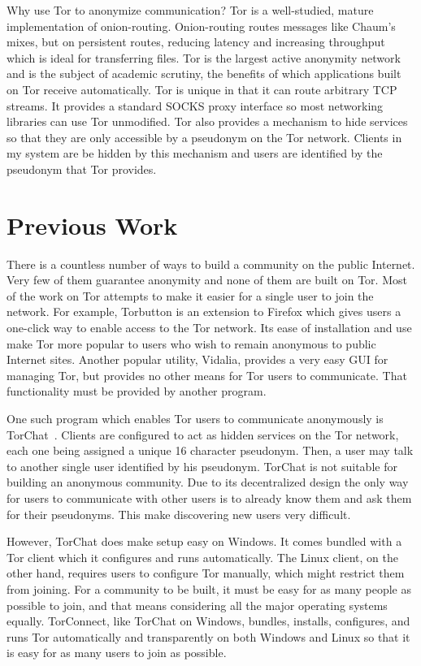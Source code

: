 \documentclass{article}
\begin{document}
Why use Tor to anonymize communication?  Tor is a well-studied, mature implementation of onion-routing.  Onion-routing routes messages like Chaum's mixes, but on persistent routes, reducing latency and increasing throughput which is ideal for transferring files.  Tor is the largest active anonymity network and is the subject of academic scrutiny, the benefits of which applications built on Tor receive automatically.  Tor is unique in that it can route arbitrary TCP streams.  It provides a standard SOCKS proxy interface so most networking libraries can use Tor unmodified.  Tor also provides a mechanism to hide services so that they are only accessible by a pseudonym on the Tor network.  Clients in my system are be hidden by this mechanism and users are identified by the pseudonym that Tor provides.


\section{Previous Work}
There is a countless number of ways to build a community on the public Internet.  Very few of them guarantee anonymity and none of them are built on Tor.  Most of the work on Tor attempts to make it easier for a single user to join the network.  For example, Torbutton is an extension to Firefox which gives users a one-click way to enable access to the Tor network.  Its ease of installation and use make Tor more popular to users who wish to remain anonymous to public Internet sites.  Another popular utility, Vidalia, provides a very easy GUI for managing Tor, but provides no other means for Tor users to communicate.  That functionality must be provided by another program.

One such program which enables Tor users to communicate anonymously is TorChat~\cite{tor-chat}.  Clients are configured to act as hidden services on the Tor network, each one being assigned a unique 16 character pseudonym.  Then, a user may talk to another single user identified by his pseudonym.  TorChat is not suitable for building an anonymous community.  Due to its decentralized design the only way for users to communicate with other users is to already know them and ask them for their pseudonyms.  This make discovering new users very difficult.

However, TorChat does make setup easy on Windows.  It comes bundled with a Tor client which it configures and runs automatically.  The Linux client, on the other hand, requires users to configure Tor manually, which might restrict them from joining.  For a community to be built, it must be easy for as many people as possible to join, and that means considering all the major operating systems equally.  TorConnect, like TorChat on Windows, bundles, installs, configures, and runs Tor automatically and transparently on both Windows and Linux so that it is easy for as many users to join as possible.
\end{document}
